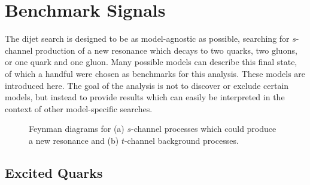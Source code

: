 \section{Benchmark Signals}

The dijet search is designed to be as model-agnostic as possible, searching for $s$-channel production of a new resonance which decays to two quarks, two gluons, or one quark and one gluon.  Many possible models can describe this final state, of which a handful were chosen as benchmarks for this analysis.  These models are introduced here.  The goal of the analysis is not to discover or exclude certain models, but instead to provide results which can easily be interpreted in the context of other model-specific searches.

\begin{figure}[]
	\centering
	\hspace{0.1\columnwidth}%
	\caption{Feynman diagrams for (a) $s$-channel processes which could produce a new resonance and (b) $t$-channel background processes.
	}
	\label{fig:Feynman}
\end{figure}

\subsection{Excited Quarks}

